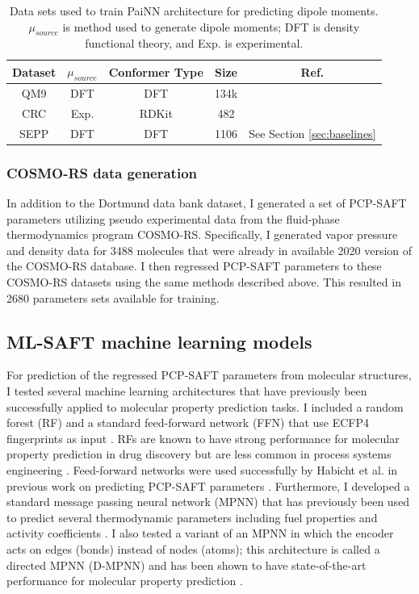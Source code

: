 \begin{table}[]
    \centering
    \caption{Data sets used to train PaiNN architecture for predicting dipole moments. $\mu_{source}$ is method used to generate dipole moments; DFT is density functional theory, and Exp. is experimental.}
    \begin{tabular}{ccccc}
         Dataset & $\mu_{source}$ & Conformer Type & Size & Ref.  \\
         \hline
         QM9 & DFT & DFT & 134k & \cite{Ramakrishnan2014}\\
         CRC & Exp. & RDKit\cite{Wang2020} & 482 & \cite{CRC2014} \\
         SEPP & DFT & DFT & 1106 & See Section \ref{sec:baselines}
    \end{tabular}

    \label{tab:painn_data}
\end{table}

\subsubsection{COSMO-RS data generation}

In addition to the Dortmund data bank dataset, I generated a set of PCP-SAFT parameters utilizing pseudo experimental data from the fluid-phase thermodynamics program COSMO-RS.\cite{Klamt2010} Specifically, I generated vapor pressure and density data for 3488 molecules that were already in available 2020 version of the COSMO-RS database. I then regressed PCP-SAFT parameters to these COSMO-RS datasets using the same methods described above. This resulted in 2680 parameters sets available for training.

\subsection{ML-SAFT machine learning models}\label{subsec:ML-SAFT_model}

For prediction of the regressed PCP-SAFT parameters from molecular structures, I tested several machine learning architectures that have previously been successfully applied to molecular property prediction tasks. I included a random forest (RF) \cite{Breiman2001} and a standard feed-forward network (FFN) that use ECFP4 fingerprints as input \cite{Rogers2010}. RFs are known to have strong performance for molecular property prediction in drug discovery but are less common in process systems engineering \cite{Ramsundar2017, Yang2019}. Feed-forward networks were used successfully by Habicht et al. in previous work on predicting PCP-SAFT parameters \cite{Habicht2023}. Furthermore, I developed a standard message passing neural network (MPNN) \cite{Gilmer2017} that has previously been used to predict several thermodynamic parameters including fuel properties \cite{Schweidtmann2020} and activity coefficients \cite{SanchezMedina2022, Rittig2023}. I also tested a variant of an MPNN in which the encoder acts on edges (bonds) instead of nodes (atoms); this architecture is called a directed MPNN (D-MPNN) and has been shown to have state-of-the-art performance for molecular property prediction \cite{Yang2019, Vermeire2021}.

